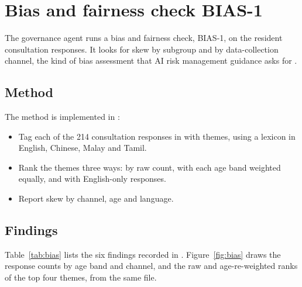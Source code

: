 \chapter{Bias and fairness check BIAS-1}
\label{ch:bias}

The governance agent runs a bias and fairness check, BIAS-1, on the resident consultation responses. It looks for skew by subgroup and by data-collection channel, the kind of bias assessment that AI risk management guidance asks for \parencite{nist2023airmf}.

\section{Method}

The method is implemented in :
\begin{itemize}
\item Tag each of the 214 consultation responses in  with themes, using a lexicon in English, Chinese, Malay and Tamil.
\item Rank the themes three ways: by raw count, with each age band weighted equally, and with English-only responses.
\item Report skew by channel, age and language.
\end{itemize}

\section{Findings}

Table~\ref{tab:bias} lists the six findings recorded in . Figure~\ref{fig:bias} draws the response counts by age band and channel, and the raw and age-re-weighted ranks of the top four themes, from the same file.

